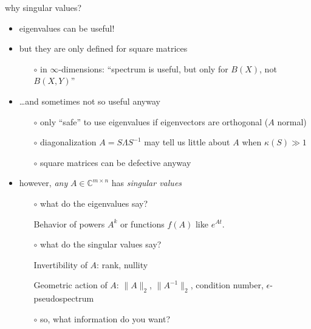 \documentclass[10pt,hyperref]{beamer}
\newcommand{\CC}{\mathbb{C}}
\newcommand{\eps}{\epsilon}
\begin{document}
\begin{frame}{why singular values?}

\begin{itemize}
\item eigenvalues can be useful!
\item but they are only defined for square matrices
    \begin{itemize}
    \item[$\circ$] in $\infty$-dimensions: ``spectrum is useful, but only for $B(X)$, not $B(X,Y)$''
    \end{itemize}
\item \dots and sometimes not so useful anyway
    \begin{itemize}
    \item[$\circ$] only ``safe'' to use eigenvalues if eigenvectors are orthogonal ($A$ normal)
    \item[$\circ$] diagonalization $A=S\Lambda S^{-1}$ may tell us little about $A$ when $\kappa(S)\gg 1$
    \item[$\circ$] square matrices can be defective anyway
    \end{itemize}
\item however, \emph{any} $A \in \CC^{m\times n}$ has \emph{singular values}
    \begin{itemize}

\medskip
    \item[$\circ$] what do the \alert{eigenvalues} say?

\medskip
    Behavior of powers $A^k$ or functions $f(A)$ like $e^{At}$.

\medskip
    \item[$\circ$] what do the \alert{singular values} say?

\medskip
Invertibility of $A$: rank, nullity

\medskip
Geometric action of $A$: $\|A\|_2$, $\|A^{-1}\|_2$, condition number, $\eps$-pseudospectrum

\medskip
    \item[$\circ$] so, what information do you want?
    \end{itemize}
\end{itemize}
\end{frame}
\end{document}
